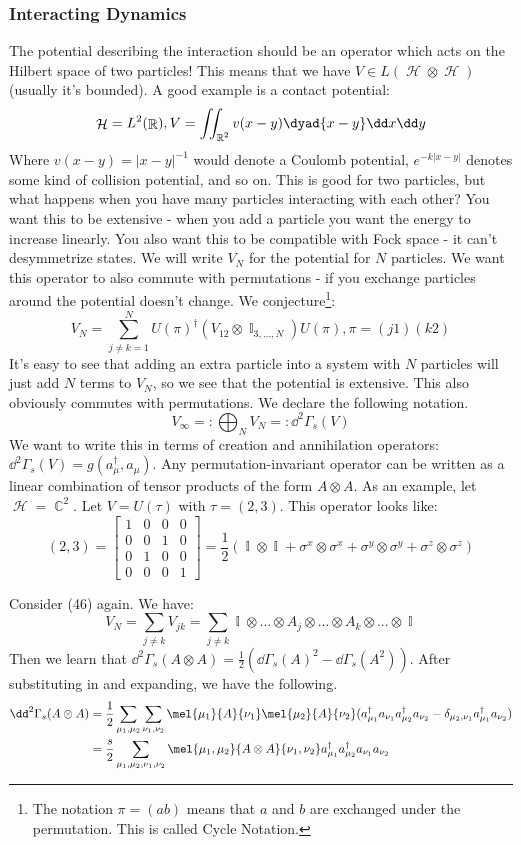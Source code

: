 \documentclass{article}
\DeclareMathOperator{\Hh}{{\mathcal{H}}}
\DeclareMathOperator{\RR}{\mathbb{R}}
\DeclareMathOperator{\II}{\mathbb{I}}
\DeclareMathOperator{\CC}{\mathbb{C}}
\begin{document}
\subsubsection{Interacting Dynamics}
The potential describing the interaction should be an operator which acts on the Hilbert space of two particles! This means that we have $V \in L(\Hh\otimes \Hh)$ (usually it's bounded). A good example is a contact potential:
\[\Hh = L^2(\RR), V = \iint_{\RR^2} v(x-y)\dyad{x-y}\dd x \dd y\]
Where $v(x-y) = |x-y|^{-1}$ would denote a Coulomb potential, $e^{-k|x-y|}$ denotes some kind of collision potential, and so on. This is good for two particles, but what happens when you have many particles interacting with each other? You want this to be extensive - when you add a particle you want the energy to increase linearly. You also want this to be compatible with Fock space - it can't desymmetrize states. We will write $V_N$ for the potential for $N$ particles. We want this operator to also commute with permutations - if you exchange particles around the potential doesn't change. We conjecture\footnote{The notation $\pi=(a b)$ means that $a$ and $b$ are exchanged under the permutation. This is called Cycle Notation.}:
\begin{equation}
V_N = \sum_{j\neq k = 1}^N U(\pi)^\dagger \left(V_{12} \otimes \II_{3,...,N}\right) U(\pi), \pi=(j 1)(k 2)
\end{equation}
It's easy to see that adding an extra particle into a system with $N$ particles will just add $N$ terms to $V_N$, so we see that the potential is extensive. This also obviously commutes with permutations. We declare the following notation.
\[V_\infty =: \bigoplus_N V_N =: \dd^2 \Gamma_s(V)\]
We want to write this in terms of creation and annihilation operators: $\dd^2\Gamma_s(V) = g(a_\mu^\dagger,a_\mu)$. Any permutation-invariant operator can be written as a linear combination of tensor products of the form $A \otimes A$. As an example, let $\Hh = \CC^2$. Let $V = U(\tau)$ with $\tau = (2,3)$. This operator looks like:
\[(2,3) = \begin{bmatrix}1&0&0&0\\0&0&1&0\\0&1&0&0\\0&0&0&1\end{bmatrix}= \frac{1}{2}\left(\II\otimes \II + \sigma^x\otimes\sigma^x + \sigma^y\otimes\sigma^y + \sigma^z\otimes \sigma^z\right)\]

Consider (46) again. We have:
\[V_N = \sum_{j\neq k}V_{jk} = \sum_{j\neq k}\II\otimes...\otimes A_j\otimes ... \otimes A_k\otimes ... \otimes \II\]
 Then we learn that $\dd^2\Gamma_s(A\otimes A) = \frac{1}{2}(\dd\Gamma_s(A)^2-\dd\Gamma_s(A^2))$. After substituting in and expanding, we have the following.
\begin{align}
\dd^2\Gamma_s(A\otimes A) &= \frac{1}{2}\sum_{\mu_1,\mu_2}\sum_{\nu_1,\nu_2}\mel{\mu_1}{A}{\nu_1}\mel{\mu_2}{A}{\nu_2}(a_{\mu_1}^\dagger a_{\nu_1} a_{\mu_2}^\dagger a_{\nu_2} - \delta_{\mu_2,\nu_1}a^\dagger_{\mu_1} a_{\nu_2})\\
&= \frac{s}{2}\sum_{\mu_1,\mu_2,\nu_1,\nu_2}\mel{\mu_1,\mu_2}{A\otimes A}{\nu_1,\nu_2} a_{\mu_1}^\dagger a_{\mu_2}^\dagger a_{\nu_1} a_{\nu_2}
\end{align}
\end{document}

